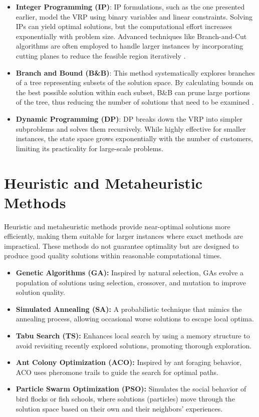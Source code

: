 \documentclass[
]{article}
\begin{document}
    \begin{itemize}
        \item \textbf{Integer Programming (IP)}: IP formulations, such as the one presented earlier, model the VRP using binary variables and linear constraints. Solving IPs can yield optimal solutions, but the computational effort increases exponentially with problem size. Advanced techniques like Branch-and-Cut algorithms are often employed to handle larger instances by incorporating cutting planes to reduce the feasible region iteratively \cite{Toth2002}.
        \item \textbf{Branch and Bound (B\&B)}: This method systematically explores branches of a tree representing subsets of the solution space. By calculating bounds on the best possible solution within each subset, B\&B can prune large portions of the tree, thus reducing the number of solutions that need to be examined \cite{Laporte1992}.
        \item \textbf{Dynamic Programming (DP)}: DP breaks down the VRP into simpler subproblems and solves them recursively. While highly effective for smaller instances, the state space grows exponentially with the number of customers, limiting its practicality for large-scale problems.
    \end{itemize}

    \hypertarget{heuristic-and-metaheuristic-methods}{%


        \section{Heuristic and Metaheuristic Methods}\label{itm:heuristic-and-metaheuristic-methods}}

    Heuristic and metaheuristic methods provide near-optimal solutions more efficiently, making them suitable for larger instances where exact methods are impractical. These methods do not guarantee optimality but are designed to produce good quality solutions within reasonable computational times.

    \begin{itemize}
        \item \textbf{Genetic Algorithms (GA):} Inspired by natural selection, GAs evolve a population of solutions using selection, crossover, and mutation to improve solution quality.
        \item \textbf{Simulated Annealing (SA):} A probabilistic technique that mimics the annealing process, allowing occasional worse solutions to escape local optima.
        \item \textbf{Tabu Search (TS):} Enhances local search by using a memory structure to avoid revisiting recently explored solutions, promoting thorough exploration.
        \item \textbf{Ant Colony Optimization (ACO):} Inspired by ant foraging behavior, ACO uses pheromone trails to guide the search for optimal paths.
        \item \textbf{Particle Swarm Optimization (PSO):} Simulates the social behavior of bird flocks or fish schools, where solutions (particles) move through the solution space based on their own and their neighbors' experiences.
    \end{itemize}
\end{document}
